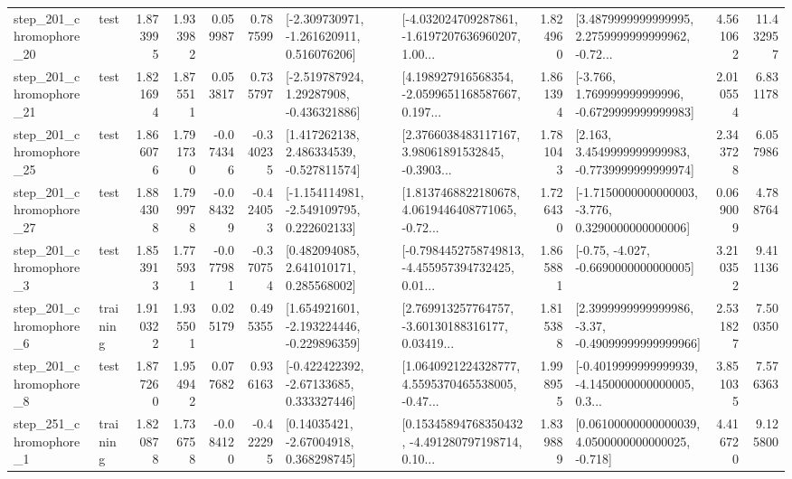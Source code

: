 \begin{tabular}{llrrrrllrlrr}
  step\_201\_chromophore\_20 &      test &      1.873995 &    1.933982 &      0.059987 &  0.787599 &   [-2.309730971, -1.261620911, 0.516076206] &  [-4.032024709287861, -1.6197207636960207, 1.00... &       1.824960 &  [3.4879999999999995, 2.2759999999999962, -0.72... &            4.561062 &         11.432957 \\
  step\_201\_chromophore\_21 &      test &      1.821694 &    1.875511 &      0.053817 &  0.735797 &    [-2.519787924, 1.29287908, -0.436321886] &  [4.198927916568354, -2.0599651168587667, 0.197... &       1.861394 &   [-3.766, 1.769999999999996, -0.6729999999999983] &            2.010554 &          6.831178 \\
  step\_201\_chromophore\_25 &      test &      1.866076 &    1.791730 &     -0.074346 & -0.340235 &    [1.417262138, 2.486334539, -0.527811574] &  [2.3766038483117167, 3.98061891532845, -0.3903... &       1.781043 &   [2.163, 3.4549999999999983, -0.7739999999999974] &            2.343728 &          6.057986 \\
  step\_201\_chromophore\_27 &      test &      1.884308 &    1.799978 &     -0.084329 & -0.424053 &   [-1.154114981, -2.549109795, 0.222602133] &  [1.8137468822180678, 4.0619446408771065, -0.72... &       1.726430 &  [-1.7150000000000003, -3.776, 0.3290000000000006] &            0.069009 &          4.788764 \\
   step\_201\_chromophore\_3 &      test &      1.853913 &    1.775931 &     -0.077981 & -0.370754 &     [0.482094085, 2.641010171, 0.285568002] &  [-0.7984452758749813, -4.455957394732425, 0.01... &       1.865881 &               [-0.75, -4.027, -0.6690000000000005] &            3.210352 &          9.411136 \\
   step\_201\_chromophore\_6 &  training &      1.910322 &    1.935501 &      0.025179 &  0.495355 &   [1.654921601, -2.193224446, -0.229896359] &  [2.769913257764757, -3.60130188316177, 0.03419... &       1.815388 &  [2.3999999999999986, -3.37, -0.49099999999999966] &            2.531827 &          7.500350 \\
   step\_201\_chromophore\_8 &      test &      1.877260 &    1.954942 &      0.077682 &  0.936163 &    [-0.422422392, -2.67133685, 0.333327446] &  [1.0640921224328777, 4.5595370465538005, -0.47... &       1.998955 &  [-0.4019999999999939, -4.1450000000000005, 0.3... &            3.851035 &          7.576363 \\
   step\_251\_chromophore\_1 &  training &      1.820878 &    1.736758 &     -0.084120 & -0.422295 &      [0.14035421, -2.67004918, 0.368298745] &  [0.15345894768350432, -4.491280797198714, 0.10... &       1.839889 &  [0.06100000000000039, 4.0500000000000025, -0.718] &            4.416720 &          9.125800 \\

\end{tabular}
